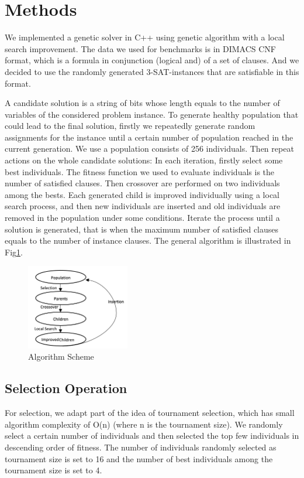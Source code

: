 \section{Methods}
We implemented a genetic solver in C++ using genetic algorithm with a local search improvement.
The data we used for benchmarks is in DIMACS CNF format, which is a formula in conjunction (logical and) of a set of clauses. And we decided to use the randomly generated 3-SAT-instances that are satisfiable in this format. 

A candidate solution is a string of bits whose length equals to the number of variables of the considered problem instance. To generate healthy population that could lead to the final solution, firstly we repeatedly generate random assignments for the instance until a certain number of population reached in the current generation. We use a population consists of 256 individuals. Then repeat actions on the whole candidate solutions: In each iteration, firstly select some best individuals. The fitness function we used to evaluate individuals is the number of satisfied clauses. Then crossover are performed on two individuals among the bests. Each generated child is improved individually using a local search process, and then new individuals are inserted and old individuals are removed in the population under some conditions. Iterate the process until a solution is generated, that is when the maximum number of satisfied clauses equals to the number of instance clauses. The general algorithm is illustrated in Fig\ref{fig:1.png}. 
\begin{figure}[h]
    \centering
    \includegraphics[width=0.4\textwidth]{1.png}
    \caption{Algorithm Scheme}
    \label{fig:1.png}
\end{figure}
\subsection{Selection Operation}
For selection, we adapt part of the idea of tournament selection, which has small algorithm complexity of O(n) (where n is the tournament size). We randomly select a certain number of individuals and then selected the top few individuals in descending order of fitness. The number of individuals randomly selected as tournament size is set to 16 and the number of best individuals among the tournament size is set to 4.
